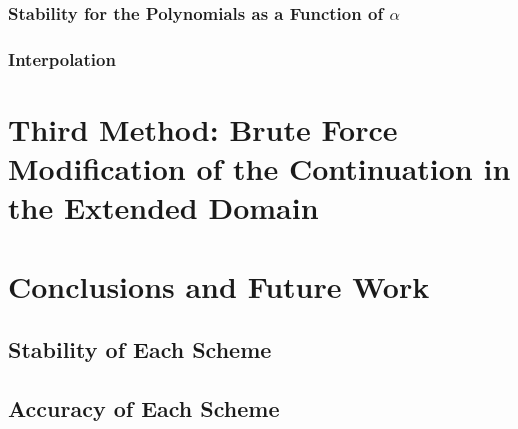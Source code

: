 \documentclass[11pt]{amsart}
\begin{document}
\subsubsection{Stability for the Polynomials as a Function of $\alpha$}
%
%
%
\subsubsection{Interpolation}
%
%
%
\section{Third Method: Brute Force Modification of the Continuation in the Extended Domain}


\section{Conclusions and Future Work}
\subsection{Stability of Each Scheme}
\subsection{Accuracy of Each Scheme}
%
%
%
\end{document}
